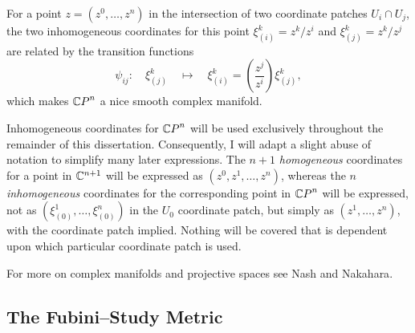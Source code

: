 For a point $z=(z^0,\ldots,z^n)$ in the intersection of 
two coordinate patches $U_i\cap U_j$,
the two inhomogeneous coordinates for this point
$\xi^k_{(i)}={z^k}/{z^i}$ and
$\xi^k_{(j)}={z^k}/{z^j}$
are related by the transition functions
\begin{equation}
\psi_{ij}\colon\quad \xi^k_{(j)}\quad\mapsto
\quad\xi^k_{(i)} = \left( \frac{z^j}{z^i} \right)
\xi^k_{(j)},
\end{equation}
which makes ${\mathbb{C} P}^n$ a nice smooth complex manifold.

Inhomogeneous coordinates for ${\mathbb{C} P}^n$ will be used
exclusively throughout the remainder of this dissertation.
Consequently, I will adapt a slight abuse of notation to simplify
many later expressions.
The $n+1$ \emph{homogeneous} coordinates for a point in ${\mathbb{C}}^{n+1}$ will be expressed
as $(z^0,z^1,\ldots,z^n)$, whereas the $n$ \emph{inhomogeneous} coordinates for the
corresponding point in ${\mathbb{C} P}^n$ will be expressed, not as
$(\xi^1_{(0)},\ldots,\xi^n_{(0)})$ in the $U_0$ coordinate patch, but
simply as $(z^1,\ldots,z^n)$, with the coordinate patch implied.
Nothing will be covered that is dependent upon which 
particular coordinate patch
is used.

For more on complex manifolds and projective spaces
see Nash\cite{Nash:?} and Nakahara\cite{Nakahara:90}.



\subsection{The Fubini--Study Metric}

